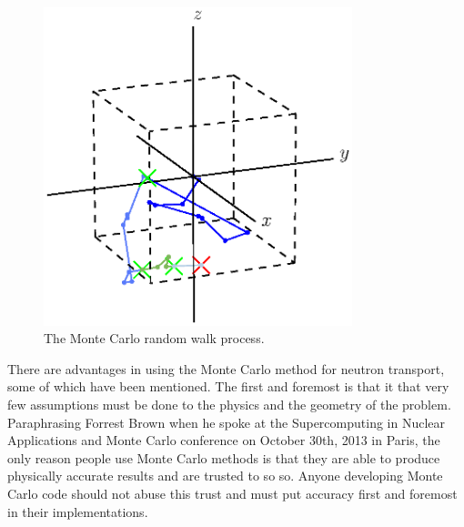 \begin{figure}[h!] 
  \centering
    \includegraphics[width=0.8\textwidth,trim= 0cm 2.5cm 0cm 0cm]{graphics/random_walk_accepted.eps}
     \caption{The Monte Carlo random walk process. \label{random_walk}}
\end{figure}

There are advantages in using the Monte Carlo method for neutron transport, some of which have been mentioned.  The first and foremost is that it that very few assumptions must be done to the physics and the geometry of the problem. Paraphrasing Forrest Brown when he spoke at the Supercomputing in Nuclear Applications and Monte Carlo conference on October 30th, 2013 in Paris,  the only reason people use Monte Carlo methods is that they are able to produce physically accurate results and are trusted to so so.  Anyone developing Monte Carlo code should not abuse this trust and must put accuracy first and foremost in their implementations.


